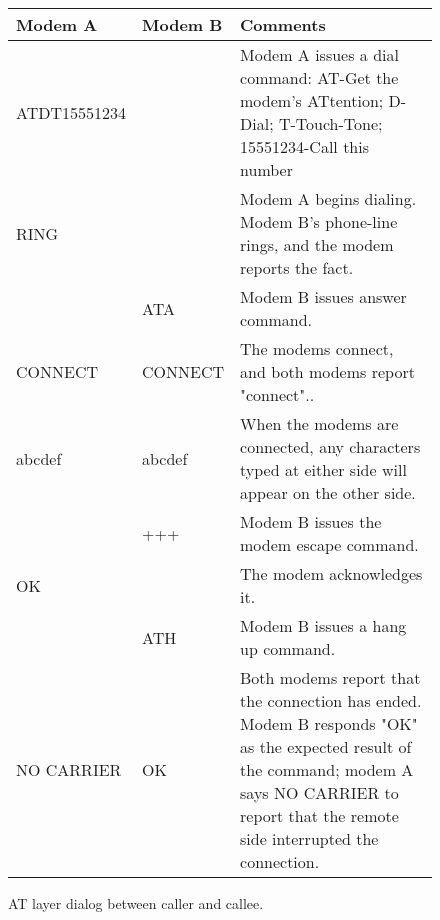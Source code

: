 \par
{
 \begin{figure}[H]

\centering  
\begin{tabularx}{\textwidth}{ L{0.2} L{0.15} L{0.65}}
  \toprule
  \textbf{Modem A} & \textbf{Modem B} & \textbf{Comments} \\
  \toprule 
   
    ATDT15551234 &	&	Modem A issues a dial command: AT-Get the modem's ATtention; D-Dial; T-Touch-Tone; 15551234-Call this number\\
    \toprule 
    RING  & 	& Modem A begins dialing. Modem B's phone-line rings, and the modem reports the fact.\\
      \toprule 
    & ATA	& Modem B issues answer command.\\
    \toprule 
    CONNECT	& CONNECT	& The modems connect, and both modems report "connect"..\\
    abcdef	& abcdef	& When the modems are connected, any characters typed at either side will appear on the other side.\\
    \toprule 
    & +++	& Modem B issues the modem escape command.\\
    \toprule 
     OK &	& The modem acknowledges it.\\
    \toprule 
    & ATH	& Modem B issues a hang up command.\\
    \toprule 
    NO CARRIER &	OK	& Both modems report that the connection has ended. Modem B responds "OK" as the expected result of the command; modem A says NO CARRIER to report that the remote side interrupted the connection.\\
   \toprule
\end{tabularx}
\caption{AT layer dialog between caller and callee.}
\end{figure}
}

